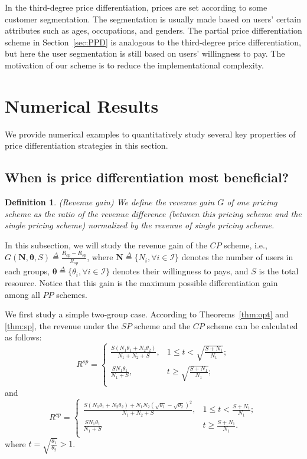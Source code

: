 \documentclass[twocolumn,10pt,twosided]{IEEEtran}
\newtheorem{definition}{Definition}
\begin{document}
In the third-degree price differentiation, prices are set according to some customer segmentation. The segmentation is usually made based on users' certain attributes such as  ages, occupations, and genders. The partial price differentiation scheme in Section~\ref{sec:PPD} is analogous to the third-degree price differentiation, but here the user segmentation is still based on users' willingness to pay. The motivation of our scheme is to reduce the implementational complexity.




\section{Numerical Results}
We provide numerical examples to quantitatively study several key properties of
price differentiation strategies in this section.
\subsection{When is price differentiation most beneficial?}
\begin{definition}
(Revenue gain) We define the revenue gain $G$ of one pricing scheme as the ratio of the revenue difference (between this pricing scheme and the single pricing scheme) normalized by  the revenue of single pricing scheme.
\end{definition}

In this subsection, we will study the revenue gain of the $CP$ scheme, i.e.,
$G(\boldsymbol{N},\boldsymbol{\theta},S)\overset{\Delta}{=}\frac{R_{cp}-R_{sp}}{R_{sp}}$, where  $\boldsymbol{N}\overset{\Delta}{=}\{N_i, \forall i\in\mathcal{I}\}$ denotes the number of users in each groups, $\boldsymbol{\theta}\overset{\Delta}{=}\{\theta_i, \forall i\in\mathcal{I}\}$ denotes their willingness to pays, and  $S$ is the total resource. Notice that this gain is the maximum possible differentiation gain among all $PP$ schemes.


We first study a simple two-group case.
According to Theorems~\ref{thm:opt} and \ref{thm:sp}, the
revenue under the $SP$ scheme and the $CP$ scheme can be calculated as follows:
$$
R^{sp}=\left\{ {\begin{array}{ll}
   \frac{S(N_1\theta_1+N_2\theta_2)}{N_1+N_2+S}, & 1\le t<\sqrt{\frac{S+N_1}{N_1}};\\
  \frac{S N_1\theta_1}{N_1+S}, &  t\ge \sqrt{\frac{S+N_1}{N_1}};\\
\end{array}} \right.
$$
and
$$
R^{cp}=\left\{ {\begin{array}{ll}
   \frac{S(N_1\theta_1+N_2\theta_2)+N_1N_2(\sqrt{\theta_1}-\sqrt{\theta_2})^2}{N_1+N_2+S}, & 1\le t<\frac{S+N_1}{N_1};\\
  \frac{S N_1\theta_1}{N_1+S}& t\ge \frac{S+N_1}{N_1}.\\
\end{array}} \right.
$$
where $t=\sqrt{\frac{\theta_1}{\theta_2}}>1$.
\end{document}
